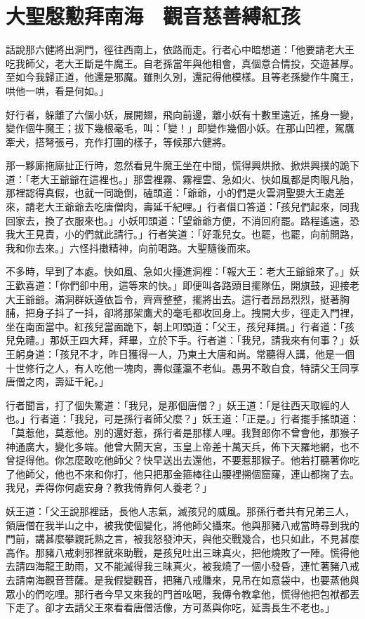 
\chapter{大聖慇懃拜南海　觀音慈善縛紅孩}

話說那六健將出洞門，徑往西南上，依路而走。行者心中暗想道：「他要請老大王吃我師父，老大王斷是牛魔王。自老孫當年與他相會，真個意合情投，交遊甚厚。至如今我歸正道，他還是邪魔。雖則久別，還記得他模樣。且等老孫變作牛魔王，哄他一哄，看是何如。」

好行者，躲離了六個小妖，展開翅，飛向前邊，離小妖有十數里遠近，搖身一變，變作個牛魔王；拔下幾根毫毛，叫：「變！」即變作幾個小妖。在那山凹裡，駕鷹牽犬，搭弩張弓，充作打圍的樣子，等候那六健將。

那一夥廝拖廝扯正行時，忽然看見牛魔王坐在中間，慌得興烘掀、掀烘興撲的跪下道：「老大王爺爺在這裡也。」那雲裡霧、霧裡雲、急如火、快如風都是肉眼凡胎，那裡認得真假，也就一同跪倒，磕頭道：「爺爺，小的們是火雲洞聖嬰大王處差來，請老大王爺爺去吃唐僧肉，壽延千紀哩。」行者借口答道：「孩兒們起來，同我回家去，換了衣服來也。」小妖叩頭道：「望爺爺方便，不消回府罷。路程遙遠，恐我大王見責，小的們就此請行。」行者笑道：「好乖兒女。也罷，也罷，向前開路，我和你去來。」六怪抖擻精神，向前喝路。大聖隨後而來。

不多時，早到了本處。快如風、急如火撞進洞裡：「報大王：老大王爺爺來了。」妖王歡喜道：「你們卻中用，這等來的快。」即便叫各路頭目擺隊伍，開旗鼓，迎接老大王爺爺。滿洞群妖遵依旨令，齊齊整整，擺將出去。這行者昂昂烈烈，挺著胸脯，把身子抖了一抖，卻將那架鷹犬的毫毛都收回身上。拽開大步，徑走入門裡，坐在南面當中。紅孩兒當面跪下，朝上叩頭道：「父王，孩兒拜揖。」行者道：「孩兒免禮。」那妖王四大拜，拜畢，立於下手。行者道：「我兒，請我來有何事？」妖王躬身道：「孩兒不才，昨日獲得一人，乃東土大唐和尚。常聽得人講，他是一個十世修行之人，有人吃他一塊肉，壽似蓬瀛不老仙。愚男不敢自食，特請父王同享唐僧之肉，壽延千紀。」

行者聞言，打了個失驚道：「我兒，是那個唐僧？」妖王道：「是往西天取經的人也。」行者道：「我兒，可是孫行者師父麼？」妖王道：「正是。」行者擺手搖頭道：「莫惹他，莫惹他。別的還好惹，孫行者是那樣人哩。我賢郎你不曾會他，那猴子神通廣大，變化多端。他曾大鬧天宮，玉皇上帝差十萬天兵，佈下天羅地網，也不曾捉得他。你怎麼敢吃他師父？快早送出去還他，不要惹那猴子。他若打聽著你吃了他師父，他也不來和你打，他只把那金箍棒往山腰裡搠個窟窿，連山都掬了去。我兒，弄得你何處安身？教我倚靠何人養老？」

妖王道：「父王說那裡話，長他人志氣，滅孩兒的威風。那孫行者共有兄弟三人，領唐僧在我半山之中，被我使個變化，將他師父攝來。他與那豬八戒當時尋到我的門前，講甚麼攀親託熟之言，被我怒發沖天，與他交戰幾合，也只如此，不見甚麼高作。那豬八戒刺邪裡就來助戰，是孩兒吐出三昧真火，把他燒敗了一陣。慌得他去請四海龍王助雨，又不能滅得我三昧真火，被我燒了一個小發昏，連忙著豬八戒去請南海觀音菩薩。是我假變觀音，把豬八戒賺來，見吊在如意袋中，也要蒸他與眾小的們吃哩。那行者今早又來我的門首吆喝，我傳令教拿他，慌得他把包袱都丟下走了。卻才去請父王來看看唐僧活像，方可蒸與你吃，延壽長生不老也。」

